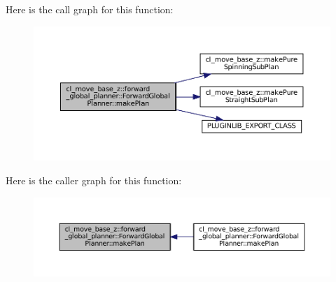 Here is the call graph for this function\+:
\nopagebreak
\begin{figure}[H]
\begin{center}
\leavevmode
\includegraphics[width=350pt]{classcl__move__base__z_1_1forward__global__planner_1_1ForwardGlobalPlanner_a9d7c48877a390ca3cc580a7ffa50d316_cgraph}
\end{center}
\end{figure}
Here is the caller graph for this function\+:
\nopagebreak
\begin{figure}[H]
\begin{center}
\leavevmode
\includegraphics[width=350pt]{classcl__move__base__z_1_1forward__global__planner_1_1ForwardGlobalPlanner_a9d7c48877a390ca3cc580a7ffa50d316_icgraph}
\end{center}
\end{figure}
\mbox{\label{classcl__move__base__z_1_1forward__global__planner_1_1ForwardGlobalPlanner_ab01769603169105e92d9b6e479147bce}} 

